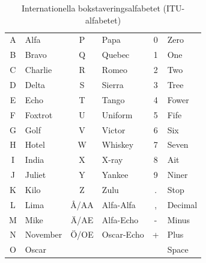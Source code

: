 \begin{table}[H]
\centering
\begin{tabular}{cl|cl|cl}
	A & Alfa     &  P   & Papa       & 0 & Zero    \\
	B & Bravo    &  Q   & Quebec     & 1 & One     \\
	C & Charlie  &  R   & Romeo      & 2 & Two     \\
	D & Delta    &  S   & Sierra     & 3 & Tree    \\
	E & Echo     &  T   & Tango      & 4 & Fower   \\
	F & Foxtrot  &  U   & Uniform    & 5 & Fife    \\
	G & Golf     &  V   & Victor     & 6 & Six     \\
	H & Hotel    &  W   & Whiskey    & 7 & Seven   \\
	I & India    &  X   & X-ray      & 8 & Ait     \\
	J & Juliet   &  Y   & Yankee     & 9 & Niner   \\
	K & Kilo     &  Z   & Zulu       & . & Stop    \\
	L & Lima     & Å/AA & Alfa-Alfa  & , & Decimal \\
	M & Mike     & Ä/AE & Alfa-Echo  & - & Minus   \\
	N & November & Ö/OE & Oscar-Echo & + & Plus    \\
	O & Oscar    &      &            &   & Space   \\
\end{tabular}
\caption{Internationella bokstaveringsalfabetet (ITU-alfabetet)}
\end{table}
